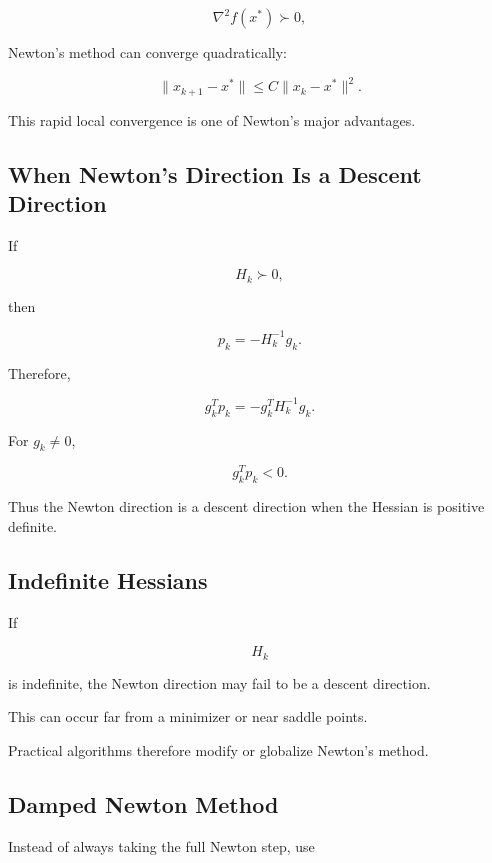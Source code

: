 \[
\nabla^2f(x^*)\succ0,
\]

Newton's method can converge quadratically:

\[
\boxed{
\|x_{k+1}-x^*\|
\leq
C
\|x_k-x^*\|^2.
}
\]

This rapid local convergence is one of Newton's major advantages.

\subsection{When Newton's Direction Is a Descent Direction}
\label{subsec:newton-descent-direction}

If

\[
H_k\succ0,
\]

then

\[
p_k
=
-H_k^{-1}g_k.
\]

Therefore,

\[
g_k^Tp_k
=
-
g_k^TH_k^{-1}g_k.
\]

For \(g_k\neq0\),

\[
\boxed{
g_k^Tp_k<0.
}
\]

Thus the Newton direction is a descent direction when the Hessian is
positive definite.

\subsection{Indefinite Hessians}
\label{subsec:indefinite-hessians}

If

\[
H_k
\]

is indefinite, the Newton direction may fail to be a descent direction.

This can occur far from a minimizer or near saddle points.

Practical algorithms therefore modify or globalize Newton's method.

\subsection{Damped Newton Method}
\label{subsec:damped-newton}

Instead of always taking the full Newton step, use

